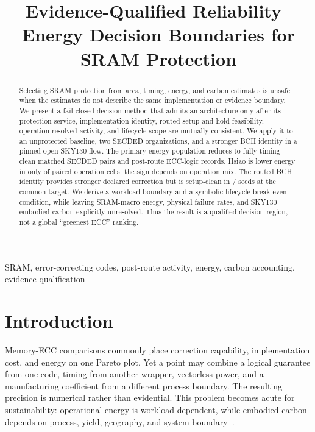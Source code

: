 \documentclass[conference]{IEEEtran}
\begin{document}
\title{Evidence-Qualified Reliability--Energy Decision Boundaries for SRAM Protection}

\author{
}

\maketitle

\begin{abstract}
Selecting SRAM protection from area, timing, energy, and carbon estimates is
unsafe when the estimates do not describe the same implementation or evidence
boundary. We present a fail-closed decision method that admits an architecture
only after its protection service, implementation identity, routed setup and
hold feasibility, operation-resolved activity, and lifecycle scope are mutually
consistent. We apply it to an unprotected baseline, two SECDED organizations,
and a stronger BCH identity in a pinned open SKY130 flow. The primary
energy population reduces to \PrimarySeedCount{} fully timing-clean matched
SECDED pairs and \PrimaryEfiveRecordCount{} post-route ECC-logic records.
Hsiao is lower energy in only \HsiaoLowerCount{} of
\PrimaryComparisonCount{} paired operation cells; the sign depends on operation
mix. The routed BCH identity provides stronger declared correction but is
setup-clean in \BchCleanCount{}/\PhysicalSeedCount{} seeds at the common target.
We derive a workload boundary and a symbolic lifecycle break-even condition,
while leaving SRAM-macro energy, physical failure rates, and SKY130 embodied
carbon explicitly unresolved. Thus the result is a qualified decision region,
not a global ``greenest ECC'' ranking.
\end{abstract}

\begin{IEEEkeywords}
SRAM, error-correcting codes, post-route activity, energy, carbon accounting,
evidence qualification
\end{IEEEkeywords}

\section{Introduction}
Memory-ECC comparisons commonly place correction capability, implementation
cost, and energy on one Pareto plot. Yet a point may combine a logical guarantee
from one code, timing from another wrapper, vectorless power, and a manufacturing
coefficient from a different process boundary. The resulting precision is
numerical rather than evidential. This problem becomes acute for sustainability:
operational energy is workload-dependent, while embodied carbon depends on
process, yield, geography, and system boundary~\cite{gupta2022act,boakes2023,pirson2023,chen2025carbonclarity}.
\end{document}
